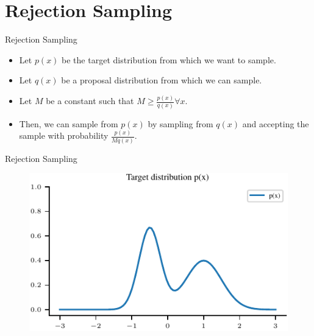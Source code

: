 \documentclass[handout]{beamer}
\begin{document}
    \section{Rejection Sampling}


    \begin{frame}{Rejection Sampling}
        \begin{itemize}
            \item Let $p(x)$ be the target distribution from which we want to sample.
            \item Let $q(x)$ be a proposal distribution from which we can sample.
            \item Let $M$ be a constant such that $M \geq \frac{p(x)}{q(x)} \forall x$.
            \item Then, we can sample from $p(x)$ by sampling from $q(x)$ and accepting the sample with probability $\frac{p(x)}{M q(x)}$.
        \end{itemize}
        
    \end{frame}

   \begin{frame}{Rejection Sampling}
    \begin{figure}
        \centering
        \includegraphics{notebooks/figures/sampling/rejection-sampling--1.0-False-False-False-False-False-False-False-False.pdf}
    \end{figure}
    
   \end{frame}
\end{document}
